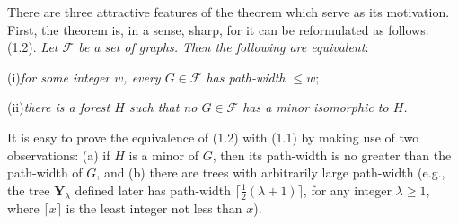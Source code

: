 There are three attractive features of the theorem which serve as its
motivation. First, the theorem is, in a sense, sharp, for it can be reformulated
as follows:
\stmt
(1.2). \textit{Let $\mathscr{F}$ be a set of graphs. Then the following are equivalent}:

\hspace*{12pt}(i)\enspace \textit{for some integer $w$, every $G\in\mathscr{F}$ has path-width $\le w$};

\hspace*{12pt}(ii)\enspace \textit{there is a forest $H$ such that no $G\in\mathscr{F}$ has a minor isomorphic
to $H$.}

It is easy to prove the equivalence of (1.2) with (1.1) by making use of
two observations: (a) if $H$ is a minor of $G$, then its path-width is no greater
than the path-width of $G$, and (b) there are trees with arbitrarily large path-width
(e.g., the tree $\mathbf{Y}_\lambda$ defined later has path-width $\lceil\frac12(\lambda+1)\rceil$, for any
integer $\lambda\ge 1$, where $\lceil x\rceil$ is the least integer not less than $x$).

